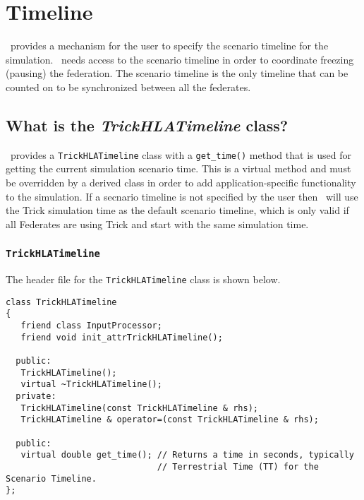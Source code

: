 \chapter{Timeline}
\label{sec:timeline}

\TrickHLA\ provides a mechanism for the user to specify the scenario timeline
for the simulation.  \TrickHLA\ needs access to the scenario timeline in order
to coordinate freezing (pausing) the federation.  The scenario timeline is the
only timeline that can be counted on to be synchronized between all the federates.

\section{What is the {\em TrickHLATimeline} class?}

\TrickHLA\ provides a {\tt TrickHLATimeline} class with a {\tt get\_time()} 
method that is used for getting the current simulation scenario time.  This is
a virtual method and must be overridden by a derived class in order to add 
application-specific functionality to the simulation.  If a secnario timeline
is not specified by the user then \TrickHLA\ will use the Trick simulation time
as the default scenario timeline, which is only valid if all Federates are using
Trick and start with the same simulation time.

\subsection{{\tt TrickHLATimeline}}

The header file for the {\tt TrickHLATimeline} class is shown below.

\begin{lstlisting}[caption={{\tt TrickHLATimeline} class header}]
class TrickHLATimeline
{
   friend class InputProcessor;
   friend void init_attrTrickHLATimeline();

  public:
   TrickHLATimeline();
   virtual ~TrickHLATimeline();
  private:
   TrickHLATimeline(const TrickHLATimeline & rhs);
   TrickHLATimeline & operator=(const TrickHLATimeline & rhs);

  public:
   virtual double get_time(); // Returns a time in seconds, typically
                              // Terrestrial Time (TT) for the Scenario Timeline.
};
\end{lstlisting}

